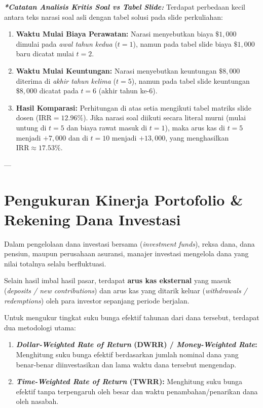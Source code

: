 \documentclass[11pt,a4paper]{article}
\begin{document}
\begin{examplebox}
\vspace{0.4em}
\noindent\textit{\textbf{*Catatan Analisis Kritis Soal vs Tabel Slide:}}
Terdapat perbedaan kecil antara teks narasi soal asli dengan tabel solusi pada slide perkuliahan:
\begin{enumerate}[label=\alph*.]
    \item \textbf{Waktu Mulai Biaya Perawatan:} Narasi menyebutkan biaya $\$1{,}000$ dimulai pada \textit{awal tahun kedua} ($t = 1$), namun pada tabel slide biaya $\$1{,}000$ baru dicatat mulai $t = 2$.
    \item \textbf{Waktu Mulai Keuntungan:} Narasi menyebutkan keuntungan $\$8{,}000$ diterima di \textit{akhir tahun kelima} ($t = 5$), namun pada tabel slide keuntungan $\$8{,}000$ dicatat pada $t = 6$ (akhir tahun ke-6).
    \item \textbf{Hasil Komparasi:} Perhitungan di atas setia mengikuti tabel matriks slide dosen ($\text{IRR} = 12.96\%$). Jika narasi soal diikuti secara literal murni (mulai untung di $t=5$ dan biaya rawat masuk di $t=1$), maka arus kas di $t=5$ menjadi $+7{,}000$ dan di $t=10$ menjadi $+13{,}000$, yang menghasilkan $\text{IRR} \approx 17.53\%$.
\end{enumerate}
\end{examplebox}

---

\section{Pengukuran Kinerja Portofolio \& Rekening Dana Investasi}

Dalam pengelolaan dana investasi bersama (\textit{investment funds}), reksa dana, dana pensiun, maupun perusahaan asuransi, manajer investasi mengelola dana yang nilai totalnya selalu berfluktuasi. 

Selain hasil imbal hasil pasar, terdapat \textbf{arus kas eksternal} yang masuk (\textit{deposits / new contributions}) dan arus kas yang ditarik keluar (\textit{withdrawals / redemptions}) oleh para investor sepanjang periode berjalan.

Untuk mengukur tingkat suku bunga efektif tahunan dari dana tersebut, terdapat dua metodologi utama:
\begin{enumerate}[label=\arabic*.]
    \item \textbf{\textit{Dollar-Weighted Rate of Return} (DWRR) / \textit{Money-Weighted Rate}:} Menghitung suku bunga efektif berdasarkan jumlah nominal dana yang benar-benar diinvestasikan dan lama waktu dana tersebut mengendap.
    \item \textbf{\textit{Time-Weighted Rate of Return} (TWRR):} Menghitung suku bunga efektif tanpa terpengaruh oleh besar dan waktu penambahan/penarikan dana oleh nasabah.
\end{enumerate}
\end{document}
